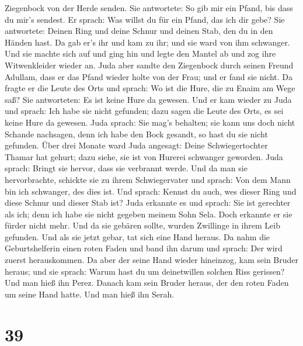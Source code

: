 Ziegenbock von der Herde senden. Sie antwortete: So gib mir ein Pfand,
bis dass du mir's sendest.  Er sprach: Was willst du für
ein Pfand, das ich dir gebe? Sie antwortete: Deinen Ring und deine
Schnur und deinen Stab, den du in den Händen hast. Da gab er's ihr und
kam zu ihr; und sie ward von ihm schwanger.  Und sie
machte sich auf und ging hin und legte den Mantel ab und zog ihre
Witwenkleider wieder an.  Juda aber sandte den Ziegenbock
durch seinen Freund Adullam, dass er das Pfand wieder holte von der
Frau; und er fand sie nicht.  Da fragte er die Leute des
Orts und sprach: Wo ist die Hure, die zu Enaim am Wege saß? Sie
antworteten: Es ist keine Hure da gewesen.  Und er kam
wieder zu Juda und sprach: Ich habe sie nicht gefunden; dazu sagen die
Leute des Orts, es sei keine Hure da gewesen.  Juda
sprach: Sie mag's behalten; sie kann uns doch nicht Schande nachsagen,
denn ich habe den Bock gesandt, so hast du sie nicht gefunden.
 Über drei Monate ward Juda angesagt: Deine
Schwiegertochter Thamar hat gehurt; dazu siehe, sie ist von Hurerei
schwanger geworden. Juda sprach: Bringt sie hervor, dass sie verbrannt
werde.  Und da man sie hervorbrachte, schickte sie zu
ihrem Schwiegervater und sprach: Von dem Mann bin ich schwanger, des
dies ist. Und sprach: Kennst du auch, wes dieser Ring und diese Schnur
und dieser Stab ist?  Juda erkannte es und sprach: Sie
ist gerechter als ich; denn ich habe sie nicht gegeben meinem Sohn Sela.
Doch erkannte er sie fürder nicht mehr.  Und da sie
gebären sollte, wurden Zwillinge in ihrem Leib gefunden. 
Und als sie jetzt gebar, tat sich eine Hand heraus. Da nahm die
Geburtshelferin einen roten Faden und band ihn darum und sprach: Der
wird zuerst herauskommen.  Da aber der seine Hand wieder
hineinzog, kam sein Bruder heraus; und sie sprach: Warum hast du um
deinetwillen solchen Riss gerissen? Und man hieß ihn Perez.
 Danach kam sein Bruder heraus, der den roten Faden um
seine Hand hatte. Und man hieß ihn Serah.

\hypertarget{section-38}{%
\section{39}\label{section-38}}

